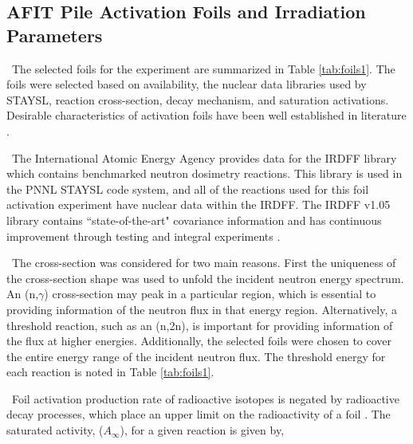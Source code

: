\documentclass[journal]{IEEEtran}
\begin{document}
	\subsection{AFIT Pile Activation Foils and Irradiation Parameters}
	
	\ The selected foils for the experiment are summarized in Table \ref{tab:foils1}. 
	The foils were selected based on availability, the nuclear data libraries used by STAYSL, reaction cross-section, decay mechanism, and saturation activations. Desirable characteristics of activation foils have been well established in literature \cite{Knoll,Luciano2012a,Kuijpers1977}.
	
	\ The International Atomic Energy Agency provides data for the IRDFF library which contains benchmarked neutron dosimetry reactions\cite{Greenwood2016}. This library is used in the PNNL STAYSL code system, and all of the reactions used for this foil activation experiment have nuclear data within the IRDFF. The IRDFF v1.05 library contains ``state-of-the-art" covariance information and has continuous improvement through testing and integral experiments \cite{Greenwood2016}. 
	
	\ The cross-section was considered for two main reasons. First the uniqueness of the cross-section shape was used to unfold the incident neutron energy spectrum. An (n,$\gamma$) cross-section may peak in a particular region, which is essential to providing information of the neutron flux in that energy region. Alternatively, a threshold reaction, 
	such as an (n,2n), is important for providing information of the flux at higher energies. Additionally, the selected foils were chosen to cover the entire energy range of the incident neutron flux. The threshold energy for each reaction is noted in Table \ref{tab:foils1}.
	
	\ Foil activation production rate of radioactive isotopes is negated by radioactive decay processes, which place an upper limit on the radioactivity of a foil \cite{Knoll}. The saturated activity, ($A_{\infty}$), for a given reaction is given by, 
\end{document}
